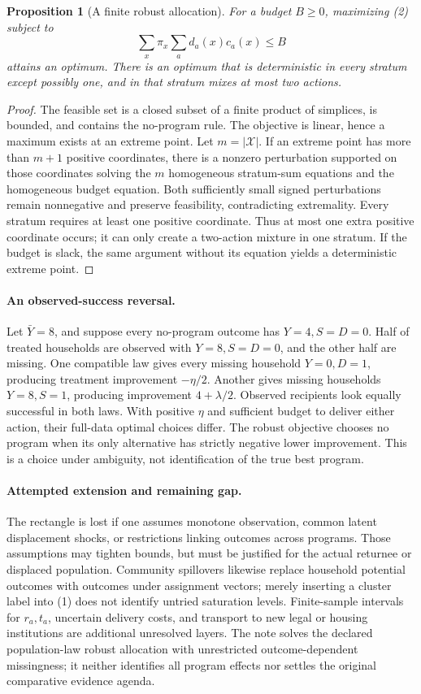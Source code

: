 \documentclass[11pt]{article}
\newtheorem{proposition}[theorem]{Proposition}
\theoremstyle{definition}
\begin{document}
\begin{proposition}[A finite robust allocation]
For a budget $B\geq0$, maximizing (2) subject to
\[
 \sum_x\pi_x\sum_a d_a(x)c_a(x)\leq B
 \tag{3}
\]
attains an optimum. There is an optimum that is deterministic in every stratum except possibly one, and in that stratum mixes at most two actions.
\end{proposition}
\begin{proof}
The feasible set is a closed subset of a finite product of simplices, is bounded, and contains the no-program rule. The objective is linear, hence a maximum exists at an extreme point. Let $m=|\mathcal X|$. If an extreme point has more than $m+1$ positive coordinates, there is a nonzero perturbation supported on those coordinates solving the $m$ homogeneous stratum-sum equations and the homogeneous budget equation. Both sufficiently small signed perturbations remain nonnegative and preserve feasibility, contradicting extremality. Every stratum requires at least one positive coordinate. Thus at most one extra positive coordinate occurs; it can only create a two-action mixture in one stratum. If the budget is slack, the same argument without its equation yields a deterministic extreme point.
\end{proof}

\paragraph{An observed-success reversal.}
Let $\bar Y=8$, and suppose every no-program outcome has $Y=4,S=D=0$. Half of treated households are observed with $Y=8,S=D=0$, and the other half are missing. One compatible law gives every missing household $Y=0,D=1$, producing treatment improvement $-\eta/2$. Another gives missing households $Y=8,S=1$, producing improvement $4+\lambda/2$. Observed recipients look equally successful in both laws. With positive $\eta$ and sufficient budget to deliver either action, their full-data optimal choices differ. The robust objective chooses no program when its only alternative has strictly negative lower improvement. This is a choice under ambiguity, not identification of the true best program.

\paragraph{Attempted extension and remaining gap.}
The rectangle is lost if one assumes monotone observation, common latent displacement shocks, or restrictions linking outcomes across programs. Those assumptions may tighten bounds, but must be justified for the actual returnee or displaced population. Community spillovers likewise replace household potential outcomes with outcomes under assignment vectors; merely inserting a cluster label into (1) does not identify untried saturation levels. Finite-sample intervals for $r_a,t_a$, uncertain delivery costs, and transport to new legal or housing institutions are additional unresolved layers. The note solves the declared population-law robust allocation with unrestricted outcome-dependent missingness; it neither identifies all program effects nor settles the original comparative evidence agenda.
\end{document}
